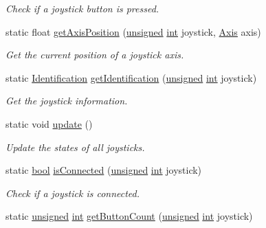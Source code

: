 \begin{DoxyCompactItemize}
\begin{DoxyCompactList}\small\item\em Check if a joystick button is pressed. \end{DoxyCompactList}\item 
static float \hyperlink{classsf_1_1_joystick_aea4930193331df1851b709f3060ba58b}{get\-Axis\-Position} (\hyperlink{curses_8priv_8h_aca40206900cfc164654362fa8d4ad1e6}{unsigned} \hyperlink{term__entry_8h_ad65b480f8c8270356b45a9890f6499ae}{int} joystick, \hyperlink{classsf_1_1_joystick_a48db337092c2e263774f94de6d50baa7}{Axis} axis)
\begin{DoxyCompactList}\small\item\em Get the current position of a joystick axis. \end{DoxyCompactList}\item 
static \hyperlink{structsf_1_1_joystick_1_1_identification}{Identification} \hyperlink{classsf_1_1_joystick_aa917c9435330e6e0368d3893672d1b74}{get\-Identification} (\hyperlink{curses_8priv_8h_aca40206900cfc164654362fa8d4ad1e6}{unsigned} \hyperlink{term__entry_8h_ad65b480f8c8270356b45a9890f6499ae}{int} joystick)
\begin{DoxyCompactList}\small\item\em Get the joystick information. \end{DoxyCompactList}\item 
static void \hyperlink{classsf_1_1_joystick_ab85fa9175b4edd3e5a07ee3cde0b0f48}{update} ()
\begin{DoxyCompactList}\small\item\em Update the states of all joysticks. \end{DoxyCompactList}\item 
static \hyperlink{term__entry_8h_a002004ba5d663f149f6c38064926abac}{bool} \hyperlink{classsf_1_1_joystick_ac7d4e1923e9f9420174f26703ea63d6c}{is\-Connected} (\hyperlink{curses_8priv_8h_aca40206900cfc164654362fa8d4ad1e6}{unsigned} \hyperlink{term__entry_8h_ad65b480f8c8270356b45a9890f6499ae}{int} joystick)
\begin{DoxyCompactList}\small\item\em Check if a joystick is connected. \end{DoxyCompactList}\item 
static \hyperlink{curses_8priv_8h_aca40206900cfc164654362fa8d4ad1e6}{unsigned} \hyperlink{term__entry_8h_ad65b480f8c8270356b45a9890f6499ae}{int} \hyperlink{classsf_1_1_joystick_a4de9f445c6582bfe9f0873f695682885}{get\-Button\-Count} (\hyperlink{curses_8priv_8h_aca40206900cfc164654362fa8d4ad1e6}{unsigned} \hyperlink{term__entry_8h_ad65b480f8c8270356b45a9890f6499ae}{int} joystick)

\end{DoxyCompactItemize}
